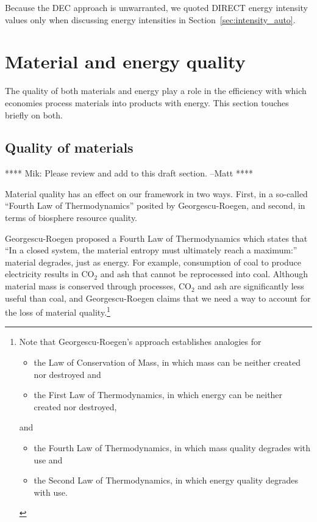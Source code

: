 Because the DEC approach is unwarranted, we quoted DIRECT energy intensity values only
when discussing energy intensities in Section~\ref{sec:intensity_auto}.


\section{Material and energy quality}
\label{sec:material_and_energy_quality}

The quality of both materials 
and energy play a role in the 
efficiency with which economies process materials into products with energy.
This section touches briefly on both.

\subsection{Quality of materials}
\label{sec:material_quality}

**** Mik: Please review and add to this draft section. --Matt ****

Material quality has an effect on our framework in two ways. 
First, in a so-called ``Fourth Law of Thermodynamics''
posited by Georgescu-Roegen, and second, 
in terms of biosphere resource quality.

Georgescu-Roegen proposed a 
Fourth Law of Thermodynamics
which states that ``In a closed system, 
the material entropy must ultimately reach a maximum:'' 
material degrades, just as energy.\cite{GeorgescuRoegen:1977tf}
For example, consumption of coal to produce electricity
results in CO$_2$ and ash that cannot
be reprocessed into coal.
Although material mass is conserved through processes, 
CO$_2$ and ash are significantly less useful than coal,
and Georgescu-Roegen claims that we need a way to account
for the loss of material quality.\footnote{Note that 
Georgescu-Roegen's approach establishes analogies for
\begin{itemize}
	\item{the Law of Conservation of Mass, 
	in which mass can be neither created nor destroyed and} 
	\item{the First Law of Thermodynamics, 
	in which energy can be neither created nor destroyed,}
\end{itemize}
\noindent{}and
\begin{itemize}
	\item{the Fourth Law of Thermodynamics,
	in which mass quality degrades with use and}
	\item{the Second Law of Thermodynamics, 
	in which energy quality degrades with use.}
\end{itemize}}

